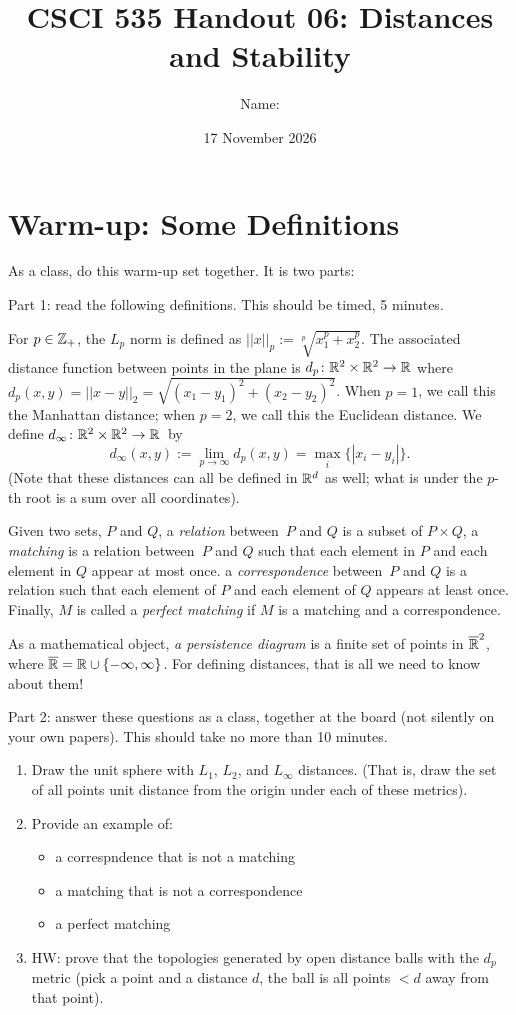 \documentclass{article}
\title{CSCI 535 Handout 06: Distances and Stability}
\date{17 November 2026}
\author{Name: \rule{3in}{0.15mm}}
\begin{document}
\maketitle

\section*{Warm-up: Some Definitions}

As a class, do this warm-up set together.  It is two parts:

Part 1: read the following definitions. This should be timed, 5 minutes.

For $p \in {\mathbb Z}_+$, the $L_p$ norm is defined as $||x||_p:=\sqrt[p]{x_1^p+x_2^p}$.
The associated distance function between points in the plane is $d_p \colon {\mathbb R}^2
\times {\mathbb R}^2 \to {\mathbb R}$ where $d_p(x,y)= ||x-y||_2 =
\sqrt{(x_1-y_1)^2+(x_2-y_2)^2}$.  When $p=1$, we call this the Manhattan
distance; when $p=2$, we call this the Euclidean distance.
We define $d_{\infty} \colon {\mathbb R}^2 \times {\mathbb R}^2 \to {\mathbb R}$~by
$$
    d_{\infty}(x,y) :=\lim_{p
    \to \infty} d_p(x,y)=\max_i\{ |x_i-y_i|\}.
$$
(Note that these distances can all be defined in ${\mathbb R}^d$ as well; what is under
the $p$-th root is a sum over all coordinates).

Given two sets, $P$ and $Q$, a \emph{relation} between~$P$ and $Q$ is a subset of $P \times Q$,
a \emph{matching} is a relation between~$P$ and $Q$ such
that each element in $P$ and each element in $Q$ appear at most once.
a \emph{correspondence} between~$P$ and $Q$ is a relation such that each element
of $P$ and each element of $Q$ appears at least once.
Finally, $M$ is
called a \emph{perfect matching} if $M$ is a matching and a correspondence.

As a mathematical object, \emph{a persistence diagram} is a finite set of points in
$\overline{{\mathbb R}}^2$, where $\overline{{\mathbb R}}={\mathbb R}\cup \{-\infty, \infty\}$.
For defining distances, that is all we need to know about them!

Part 2: answer these questions as a class, together at the board (not silently
on your own papers). This should
take no more than 10 minutes.

\begin{enumerate}
    \item  Draw the unit sphere with $L_1$, $L_2$, and $L_{\infty}$ distances.
        (That is, draw the set of all points unit distance from the origin under
        each of these metrics).
    \item Provide an example of:
        \begin{itemize}
            \item a correspndence that is not a matching
            \item a matching that is not a correspondence
            \item a perfect matching
        \end{itemize}
    \item HW: prove that the topologies generated by open distance balls with
        the $d_p$ metric (pick a
        point and a distance $d$, the ball is all points $< d$ away from that
        point).
\end{enumerate}
\end{document}
